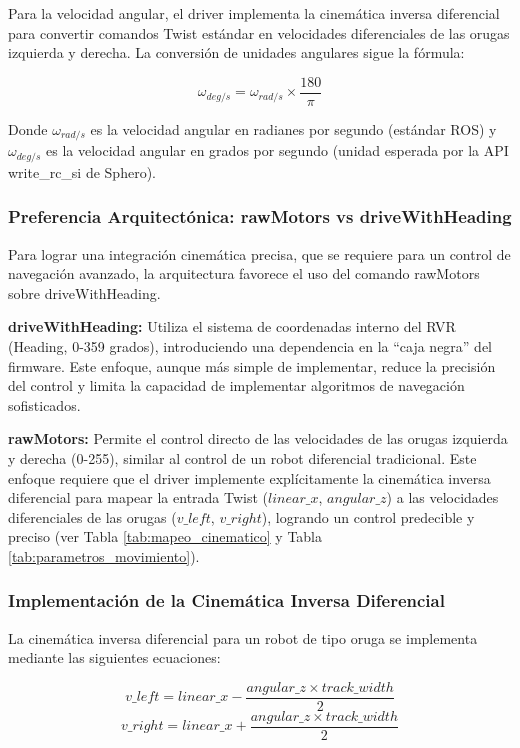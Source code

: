 \documentclass[11pt]{article}
\newcommand{\code}[1]{\textcolor{codeblue}{\url{#1}}}
\numberwithin{figure}{section}
\numberwithin{table}{section}
\def\code#1{#1}%
\begin{document}
Para la velocidad angular, el driver implementa la cinemática inversa diferencial para convertir comandos Twist estándar en velocidades diferenciales de las orugas izquierda y derecha. La conversión de unidades angulares sigue la fórmula:

$$\omega_{deg/s} = \omega_{rad/s} \times \frac{180}{\pi}$$

Donde $\omega_{rad/s}$ es la velocidad angular en radianes por segundo (estándar ROS) y $\omega_{deg/s}$ es la velocidad angular en grados por segundo (unidad esperada por la API \code{write\_rc\_si} de Sphero).


\subsubsection{Preferencia Arquitectónica: rawMotors vs driveWithHeading}

Para lograr una integración cinemática precisa, que se requiere para un control de navegación avanzado, la arquitectura favorece el uso del comando rawMotors sobre driveWithHeading.

\textbf{driveWithHeading:} Utiliza el sistema de coordenadas interno del RVR (Heading, 0-359 grados), introduciendo una dependencia en la ``caja negra'' del firmware. Este enfoque, aunque más simple de implementar, reduce la precisión del control y limita la capacidad de implementar algoritmos de navegación sofisticados.

\textbf{rawMotors:} Permite el control directo de las velocidades de las orugas izquierda y derecha (0-255), similar al control de un robot diferencial tradicional. Este enfoque requiere que el driver implemente explícitamente la cinemática inversa diferencial para mapear la entrada Twist ($linear\_x$, $angular\_z$) a las velocidades diferenciales de las orugas ($v\_left$, $v\_right$), logrando un control predecible y preciso (ver Tabla \ref{tab:mapeo_cinematico} y Tabla \ref{tab:parametros_movimiento}).


\subsubsection{Implementación de la Cinemática Inversa Diferencial}

La cinemática inversa diferencial para un robot de tipo oruga se implementa mediante las siguientes ecuaciones:

$$v\_left = linear\_x - \frac{angular\_z \times track\_width}{2}$$
$$v\_right = linear\_x + \frac{angular\_z \times track\_width}{2}$$
\end{document}
